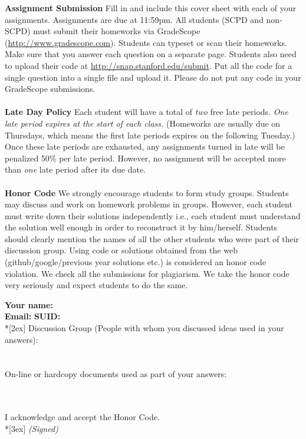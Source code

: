 \documentclass[11pt]{article}
\begin{document}
\textbf{Assignment Submission } Fill in and include this cover sheet with each of your assignments. Assignments are due at 11:59pm. All students (SCPD and non-SCPD) must submit their homeworks via GradeScope (\url{http://www.gradescope.com}). Students can typeset or scan their homeworks. Make sure that you answer each question on a separate page. Students also need to upload their code at \url{http://snap.stanford.edu/submit}. Put all the code for a single question into a single file and upload it. Please do not put any code in your GradeScope submissions.
\\
\\
\textbf{Late Day Policy } Each student will have a total of {\em two} free late periods. {\em One late period expires at the start of each class.} (Homeworks are usually due on Thursdays, which means the first late periods expires on the following Tuesday.) Once these late periods are exhausted, any assignments turned in late will be penalized 50\% per late period. However, no assignment will be accepted more than {\em one} late period after its due date.
\\
\\
\textbf{Honor Code } We strongly encourage students to form study groups. Students may discuss and work on homework problems in groups. However, each student must write down their solutions independently i.e., each student must understand the solution well enough in order to reconstruct it by him/herself.  Students should clearly mention the names of all the other students who were part of their discussion group. Using code or solutions obtained from the web (github/google/previous year solutions etc.) is considered an honor code violation. We check all the submissions for plagiarism. We take the honor code very seriously and expect students to do the same.

\vfill
\vfill

{\Large
\textbf{Your name:} \hrulefill \\
\textbf{Email:} \underline{\hspace*{7cm}} \textbf{SUID:} \hrulefill\\*[2ex] }
Discussion Group (People with whom you discussed ideas used in your answers): \\\\\\
On-line or hardcopy documents used as part of your answers: \\\\\\
\vfill

\vfill

I acknowledge and accept the Honor Code.\\*[3ex]
\bigskip
\textit{(Signed)}\hrulefill

\vfill
\vfill
\end{document}

